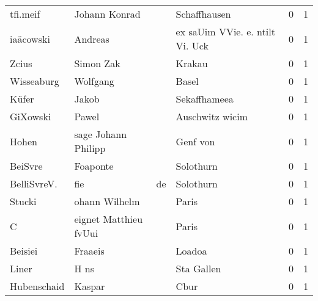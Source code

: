 \documentclass[10pt,a4paper,landscape]{article}
\begin{document}
\begin{longtable}{llllrr}
                 tfi.meif &                      Johann Konrad &             &                                Schaffhausen &          0 &         1 \\
                iaäcowski &                            Andreas &             &             ex saUim VVie. e. ntilt Vi. Uck &          0 &         1 \\
                    Zcius &                          Simon Zak &             &                                      Krakau &          0 &         1 \\
               Wisseaburg &                           Wolfgang &             &                                       Basel &          0 &         1 \\
                    Küfer &                              Jakob &             &                                Sekaffhameea &          0 &         1 \\
                 GiXowski &                              Pawel &             &                             Auschwitz wicim &          0 &         1 \\
                    Hohen &                sage Johann Philipp &             &                                    Genf von &          0 &         1 \\
                  BeiSvre &                           Foaponte &             &                                   Solothurn &          0 &         1 \\
              BelliSvreV. &                                fie &          de &                                   Solothurn &          0 &         1 \\
                   Stucki &                      ohann Wilhelm &             &                                       Paris &          0 &         1 \\
                        C &              eignet Matthieu fvUui &             &                                       Paris &          0 &         1 \\
                  Beisiei &                            Fraaeis &             &                                      Loadoa &          0 &         1 \\
                    Liner &                               H ns &             &                                  Sta Gallen &          0 &         1 \\
              Hubenschaid &                             Kaspar &             &                                        Cbur &          0 &         1 \\

\end{longtable}
\end{document}
